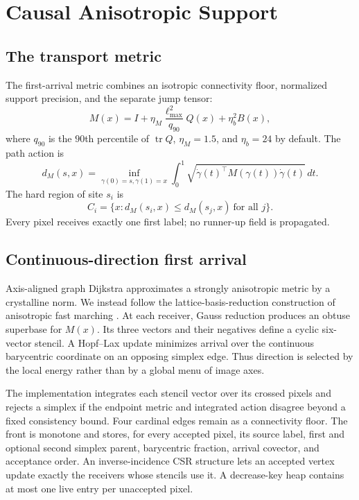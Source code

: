 \documentclass[11pt,letterpaper]{article}
\newcommand{\tr}{\operatorname{tr}}
\begin{document}
\section{Causal Anisotropic Support}
\label{sec:transport}

\subsection{The transport metric}

The first-arrival metric combines an isotropic connectivity floor, normalized support
precision, and the separate jump tensor:
\begin{equation}
M(x)=I+
\eta_M\frac{\ell_{\max}^2}{q_{90}}Q(x)
+\eta_b^2 B(x),
\label{eq:metric}
\end{equation}
where \(q_{90}\) is the \(90\)th percentile of \(\tr Q\), \(\eta_M=1.5\), and
\(\eta_b=24\) by default. The path action is
\begin{equation}
d_M(s,x)=\inf_{\gamma(0)=s,\gamma(1)=x}
\int_0^1\sqrt{\dot\gamma(t)^\top M(\gamma(t))\dot\gamma(t)}\,dt.
\label{eq:distance}
\end{equation}
The hard region of site \(s_i\) is
\begin{equation}
C_i=\{x:d_M(s_i,x)\le d_M(s_j,x)\ \text{for all }j\}.
\label{eq:cells}
\end{equation}
Every pixel receives exactly one first label; no runner-up field is propagated.

\subsection{Continuous-direction first arrival}

Axis-aligned graph Dijkstra approximates a strongly anisotropic metric by a crystalline
norm. We instead follow the lattice-basis-reduction construction of anisotropic fast
marching \citep{mirebeau2014afm,mirebeau2019hfm}. At each receiver, Gauss reduction
produces an obtuse superbase for \(M(x)\). Its three vectors and their negatives define
a cyclic six-vector stencil. A Hopf--Lax update minimizes arrival over the continuous
barycentric coordinate on an opposing simplex edge. Thus direction is selected by the
local energy rather than by a global menu of image axes.

The implementation integrates each stencil vector over its crossed pixels and rejects
a simplex if the endpoint metric and integrated action disagree beyond a fixed
consistency bound. Four cardinal edges remain as a connectivity floor. The front is
monotone and stores, for every accepted pixel, its source label, first and optional
second simplex parent, barycentric fraction, arrival covector, and acceptance order.
An inverse-incidence CSR structure lets an accepted vertex update exactly the receivers
whose stencils use it. A decrease-key heap contains at most one live entry per
unaccepted pixel.
\end{document}

